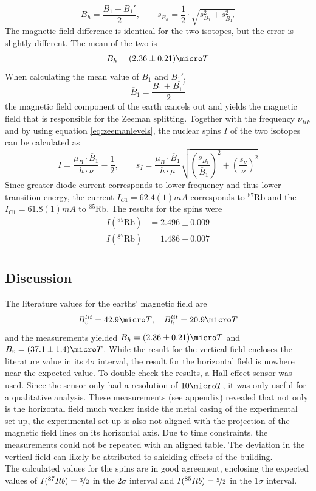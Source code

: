 \begin{equation}
B_h=\frac{B_1-B_1'}{2},\qquad s_{B_h}=\frac{1}{2}\cdot\sqrt{s_{B_1}^2+s_{B_1'}^2}
\end{equation}
The magnetic field difference is identical for the two isotopes, but the error is slightly different. The mean of the two is
\begin{equation}
B_h=\unit{(2.36\pm 0.21)}{\micro T}
\end{equation}
When calculating the mean value of $B_1$ and $B_1'$,
\begin{equation}
\overline{B}_1=\frac{B_1+B_1'}{2}
\end{equation}
the magnetic field component of the earth cancels out and yields the magnetic field that is responsible for the Zeeman splitting. Together with the frequency $\nu_{RF}$ and by using equation \ref{eq:zeemanlevels}, the nuclear spins $I$ of the two isotopes can be calculated as
\begin{equation}
I=\frac{\mu_B\cdot \overline{B}_1}{h\cdot\nu}-\frac{1}{2},\qquad s_I=\frac{\mu_B\cdot \overline{B}_1}{h\cdot\mu}
\sqrt{\left(\frac{s_{\overline{B}_1}}{\overline{B}_1}\right)^2
	+\left(\frac{s_\nu}{\nu}\right)^2}
\end{equation}
Since greater diode current corresponds to lower frequency and thus lower transition energy, the current $I_{C1}=\unit{62.4(1)}{mA}$ corresponds to $^{87}$Rb and the $I_{C1}=\unit{61.8(1)}{mA}$ to $^{85}$Rb. The results for the spins were
\begin{align}
	I(^{85}\text{Rb})&=2.496\pm0.009\\
	I(^{87}\text{Rb})&=1.486\pm0.007\\
\end{align}
\subsection{Discussion}
The literature values for the earths' magnetic field are \cite{anleitung}
\begin{equation}
B_v^{lit}=\unit{42.9}{\micro T}, \quad B_h^{lit}=\unit{20.9}{\micro T}
\end{equation}
and the measurements yielded $B_h=\unit{(2.36\pm 0.21)}{\micro T}$ and $B_v=\unit{(37.1\pm1.4)}{\micro T}$. While the result for the vertical field encloses the literature value in its $4\sigma$ interval, the result for the horizontal field is nowhere near the expected value. To double check the results, a Hall effect sensor was used. Since the sensor only had a resolution of $\unit{10}{\micro T}$, it was only useful for a qualitative analysis. These measurements (see appendix) revealed that not only is the horizontal field much weaker inside the metal casing of the experimental set-up, the experimental set-up is also not aligned with the projection of the magnetic field lines on its horizontal axis. Due to time constraints, the measurements could not be repeated with an aligned table. The deviation in the vertical field can likely be attributed to shielding effects of the building.\\

The calculated values for the spins are in good agreement, enclosing the expected values of $I(^{87}Rb)=\nicefrac{3}{2}$ in the $2\sigma$ interval and $I(^{85}Rb)=\nicefrac{5}{2}$ in the $1\sigma$ interval.
